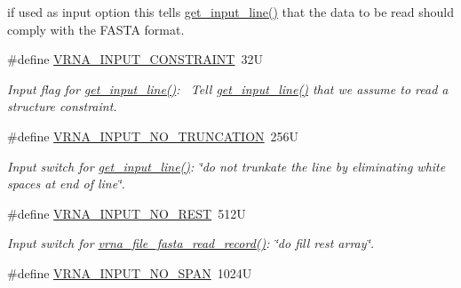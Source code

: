 \begin{DoxyCompactItemize}
\begin{DoxyCompactList}
if used as input option this tells \hyperlink{group__utils_ga8ef1835eb83f542396f59f0b205965e5}{get\+\_\+input\+\_\+line()} that the data to be read should comply with the F\+A\+S\+TA format. \end{DoxyCompactList}\item 
\#define \hyperlink{group__utils_gac08a9df45b9721b97a47dbfe7a6e5f85}{V\+R\+N\+A\+\_\+\+I\+N\+P\+U\+T\+\_\+\+C\+O\+N\+S\+T\+R\+A\+I\+NT}~32U
\begin{DoxyCompactList}\small\item\em Input flag for \hyperlink{group__utils_ga8ef1835eb83f542396f59f0b205965e5}{get\+\_\+input\+\_\+line()}\+:~\newline
Tell \hyperlink{group__utils_ga8ef1835eb83f542396f59f0b205965e5}{get\+\_\+input\+\_\+line()} that we assume to read a structure constraint. \end{DoxyCompactList}\item 
\mbox{\label{group__utils_ga086742158293217a46ae2f71bb296937}} 
\#define \hyperlink{group__utils_ga086742158293217a46ae2f71bb296937}{V\+R\+N\+A\+\_\+\+I\+N\+P\+U\+T\+\_\+\+N\+O\+\_\+\+T\+R\+U\+N\+C\+A\+T\+I\+ON}~256U
\begin{DoxyCompactList}\small\item\em Input switch for \hyperlink{group__utils_ga8ef1835eb83f542396f59f0b205965e5}{get\+\_\+input\+\_\+line()}\+: {\itshape \char`\"{}do not trunkate the line by eliminating white spaces at end of line\char`\"{}}. \end{DoxyCompactList}\item 
\mbox{\label{group__utils_ga7a2e8c50a0c7ce82e60da1016e1367fd}} 
\#define \hyperlink{group__utils_ga7a2e8c50a0c7ce82e60da1016e1367fd}{V\+R\+N\+A\+\_\+\+I\+N\+P\+U\+T\+\_\+\+N\+O\+\_\+\+R\+E\+ST}~512U
\begin{DoxyCompactList}\small\item\em Input switch for \hyperlink{group__file__formats_ga8cfb7e271efc9e1f34640acb85475639}{vrna\+\_\+file\+\_\+fasta\+\_\+read\+\_\+record()}\+: {\itshape \char`\"{}do fill rest array\char`\"{}}. \end{DoxyCompactList}\item 
\mbox{\label{group__utils_ga0de536599b881c787b0943a2671da476}} 
\#define \hyperlink{group__utils_ga0de536599b881c787b0943a2671da476}{V\+R\+N\+A\+\_\+\+I\+N\+P\+U\+T\+\_\+\+N\+O\+\_\+\+S\+P\+AN}~1024U

\end{DoxyCompactItemize}
